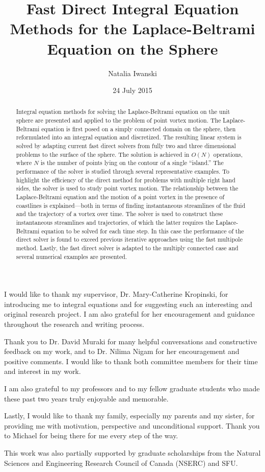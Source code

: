 \documentclass{sfuthesis}
\title{Fast Direct Integral Equation Methods for the Laplace-Beltrami Equation on the Sphere}
\author{Natalia Iwanski}
\date{24 July 2015}
\begin{document}
\frontmatter
\maketitle{}
\makecommittee{}

\begin{abstract}
Integral equation methods for solving the Laplace-Beltrami equation on the unit sphere are presented and applied to the problem of point vortex motion. The Laplace-Beltrami equation is first posed on a simply connected domain on the sphere, then reformulated into an integral equation and discretized. The resulting linear system is solved by adapting current fast direct solvers from fully two and three dimensional problems to the surface of the sphere. The solution is achieved in $O(N)$ operations, where $N$ is the number of points lying on the contour of a single \enquote{island.} The performance of the solver is studied through several representative examples. To highlight the efficiency of the direct method for problems with multiple right hand sides, the solver is used to study point vortex motion. The relationship between the Laplace-Beltrami equation and the motion of a point vortex in the presence of coastlines is explained---both in terms of finding instantaneous streamlines of the fluid and the trajectory of a vortex over time. The solver is used to construct these instantaneous streamlines and trajectories, of which the latter requires the Laplace-Beltrami equation to be solved for each time step. In this case the performance of the direct solver is found to exceed previous iterative approaches using the fast multipole method. Lastly, the fast direct solver is adapted to the multiply connected case and several numerical examples are presented.\end{abstract}

\begin{acknowledgements} 
I would like to thank my supervisor, Dr. Mary-Catherine Kropinski, for introducing me to integral equations and for suggesting such an interesting and original research project.  I am also grateful for her encouragement and guidance throughout the research and writing process. 

Thank you to Dr. David Muraki for many helpful conversations and constructive feedback on my work, and to Dr. Nilima Nigam for her encouragement and positive comments. I would like to thank both committee members for their time and interest in my work. 

I am also grateful to my professors and to my fellow graduate students who made these past two years truly enjoyable and memorable. 

Lastly, I would like to thank my family, especially my parents and my sister, for providing me with motivation, perspective and unconditional support. Thank you to Michael for being there for me every step of the way. 

This work was also partially supported by graduate scholarships from the Natural Sciences and Engineering Research Council of Canada (NSERC) and SFU. 

\end{acknowledgements}
\end{document}
